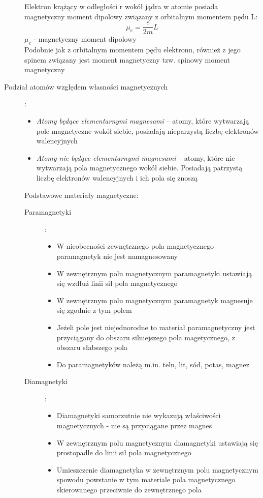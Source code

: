 \documentclass[a4paper,11pt]{article}
\begin{document}
\begin{description}
  Elektron krążący w odległości r wokół jądra w atomie posiada magnetyczny moment dipolowy związany z orbitalnym momentem pędu L:
  $$\mu_e = \frac{e}{2m}L$$
  $\mu_e$ - magnetyczny moment dipolowy\\
  Podobnie jak z orbitalnym momentem pędu elektronu, również z jego spinem związany jest moment magnetyczny tzw. spinowy moment magnetyczny
\item[Podział atomów względem własności magnetycznych]:\\
  \begin{itemize}
  \item \emph{Atomy będące elementarnymi magnesami} -- atomy, które wytwarzają pole magnetyczne wokół siebie, posiadają nieparzystą liczbę elektronów walencyjnych
  \item \emph{Atomy nie będące elementarnymi magnesami} -- atomy, które nie wytwarzają pola magnetycznego wokół siebie. Posiadają patrzystą liczbę elektronów walencyjnych i ich pola się znoszą
  \end{itemize}
  Podstawowe materiały magnetyczne:
  \begin{description}
  \item[Paramagnetyki]:\\
    \begin{itemize}
    \item W nieobecności zewnętrznego pola magnetycznego paramagnetyk nie jest namagnesowany
    \item W zewnętrznym polu magnetycznym paramagnetyki ustawiają się wzdłuż linii sił pola magnetycznego
    \item W zewnętrznym polu magnetycznym paramagnetyk magnesuje się zgodnie z tym polem
    \item Jeżeli pole jest niejednorodne to materiał paramagnetyczny jest przyciągany do obszaru silniejszego pola magetycznego, z obszaru słabszego pola
    \item Do paramagnetyków należą m.in. teln, lit, sód, potas, magnez
    \end{itemize}
  \item[Diamagnetyki]:\\
    \begin{itemize}
    \item Diamagnetyki samorzutnie nie wykazują właściwości magnetycznych - nie są przyciągane przez magnes
    \item W zewnętrznym polu magnetycznym diamagnetyki ustawiają się prostopadle do linii sił pola magnetycznego
    \item Umieszczenie diamagnetyka w zewnętrznym polu magnetycznym spowodu powstanie w tym materiale pola magnetycznego skierowanego przeciwnie do zewnętrznego pola

\end{itemize}
\end{description}
\end{description}
\end{document}
